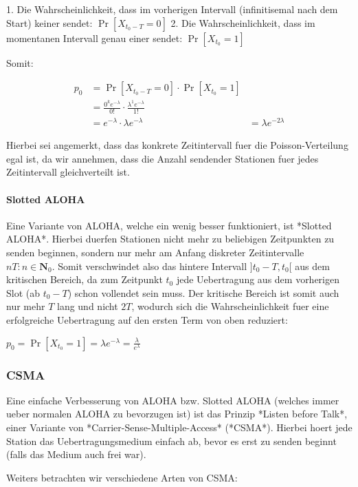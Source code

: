1. Die Wahrscheinlichkeit, dass im vorherigen Intervall (infinitisemal nach dem Start) keiner sendet: $\Pr[X_{t_0 - T} = 0]$
2. Die Wahrscheinlichkeit, dass im momentanen Intervall genau einer sendet:
   $\Pr[X_{t_0} = 1]$

Somit:


\begin{align}
	p_0 &= \Pr[X_{t_0 - T} = 0] \cdot \Pr[X_{t_0} = 1]\\
	    &= \frac{0^k e^{-\lambda}}{0!} \cdot \frac{\lambda^1 e^{-\lambda}}{1!}\\
		&= e^{-\lambda} \cdot \lambda e^{-\lambda}
		&= \lambda e^{-2\lambda}
\end{align}


Hierbei sei angemerkt, dass das konkrete Zeitintervall fuer die
Poisson-Verteilung egal ist, da wir annehmen, dass die Anzahl sendender
Stationen fuer jedes Zeitintervall gleichverteilt ist.

\paragraph{Slotted ALOHA} 

Eine Variante von ALOHA, welche ein wenig besser funktioniert, ist *Slotted
ALOHA*. Hierbei duerfen Stationen nicht mehr zu beliebigen Zeitpunkten zu senden
beginnen, sondern nur mehr am Anfang diskreter Zeitintervalle $nT: n \in
\mathbf{N}_0$. Somit verschwindet also das hintere Intervall $]t_0 - T,
t_0[$ aus dem kritischen Bereich, da zum Zeitpunkt $t_0$ jede Uebertragung aus dem vorherigen Slot (ab $t_0 - T$) schon vollendet sein muss. Der kritische Bereich ist somit auch nur mehr $T$ lang und nicht $2T$, wodurch sich die Wahrscheinlichkeit fuer eine erfolgreiche Uebertragung auf den ersten Term von oben reduziert:

$p_0 = \Pr[X_{t_0} = 1] = \lambda e^{-\lambda} = \frac{\lambda}{e^\lambda}$

\subsubsection{CSMA} 

Eine einfache Verbesserung von ALOHA bzw. Slotted ALOHA (welches immer ueber
normalen ALOHA zu bevorzugen ist) ist das Prinzip *Listen before Talk*, einer
Variante von *Carrier-Sense-Multiple-Access* (*CSMA*). Hierbei hoert jede Station
das Uebertragungsmedium einfach ab, bevor es erst zu senden beginnt (falls das
Medium auch frei war).

Weiters betrachten wir verschiedene Arten von CSMA:

